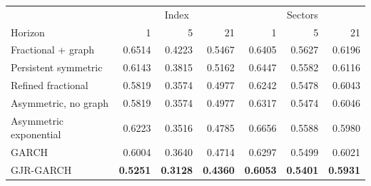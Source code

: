 \begin{tabular}{lrrrrrr}
\toprule
 & \multicolumn{3}{c}{Index} & \multicolumn{3}{c}{Sectors} \\
Horizon & 1 & 5 & 21 & 1 & 5 & 21 \\
\midrule
Fractional + graph & 0.6514 & 0.4223 & 0.5467 & 0.6405 & 0.5627 & 0.6196 \\
Persistent symmetric & 0.6143 & 0.3815 & 0.5162 & 0.6447 & 0.5582 & 0.6116 \\
Refined fractional & 0.5819 & 0.3574 & 0.4977 & 0.6242 & 0.5478 & 0.6043 \\
Asymmetric, no graph & 0.5819 & 0.3574 & 0.4977 & 0.6317 & 0.5474 & 0.6046 \\
Asymmetric exponential & 0.6223 & 0.3516 & 0.4785 & 0.6656 & 0.5588 & 0.5980 \\
GARCH & 0.6004 & 0.3640 & 0.4714 & 0.6297 & 0.5499 & 0.6021 \\
GJR-GARCH & \textbf{0.5251} & \textbf{0.3128} & \textbf{0.4360} & \textbf{0.6053} & \textbf{0.5401} & \textbf{0.5931} \\
\bottomrule
\end{tabular}
